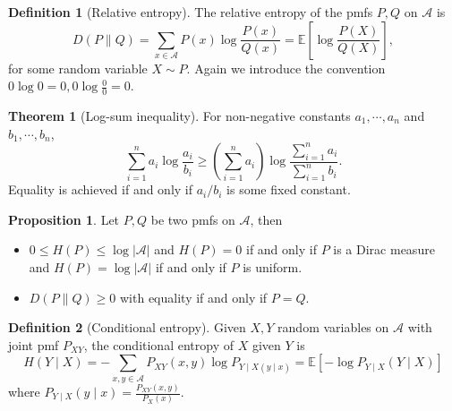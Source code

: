 \documentclass[]{article}
\theoremstyle{definition}
\newtheorem{theorem}{Theorem}
\newtheorem*{definition}{Definition}
\newtheorem*{proposition}{Proposition}
\begin{document}
\begin{definition}[Relative entropy]
  The relative entropy of the pmfs \(P, Q\) on \(\mathscr{A}\) is 
  \[D(P \| Q)= \sum_{x \in \mathscr{A}}P(x) \log\frac{P(x)}{Q(x)} = 
  \mathbb{E}\left[\log\frac{P(X)}{Q(X)}\right],\]
  for some random variable \(X \sim P\). Again we introduce the convention 
  \(0\log 0 = 0, 0 \log \frac{0}{0} = 0\).
\end{definition}

\begin{theorem}[Log-sum inequality]
  For non-negative constants \(a_1, \cdots, a_n\) and \(b_1, \cdots, b_n\),
  \[\sum_{i = 1}^n a_i\log\frac{a_i}{b_i} \ge \left(\sum_{i = 1}^n a_i\right) \log \frac{\sum_{i = 1}^n a_i}{\sum_{i = 1}^n b_i}.\]
  Equality is achieved if and only if \(a_i / b_i\) is some fixed constant.
\end{theorem}

\begin{proposition}
  Let \(P, Q\) be two pmfs on \(\mathscr{A}\), then 
  \begin{itemize}
    \item \(0 \le H(P) \le \log|\mathscr{A}|\) and \(H(P) = 0\) if and only if \(P\) is a Dirac measure
      and \(H(P) = \log|\mathscr{A}|\) if and only if \(P\) is uniform.
    \item \(D(P \| Q) \ge 0\) with equality if and only if \(P = Q\).
  \end{itemize}
\end{proposition}

\begin{definition}[Conditional entropy]
  Given \(X, Y\) random variables on \(\mathscr{A}\) with joint pmf \(P_{XY}\), the conditional entropy 
  of \(X\) given \(Y\) is 
  \[H(Y \mid X) = -\sum_{x,y \in \mathscr{A}} P_{XY}(x, y) \log P_{Y \mid X(y \mid x)}= \mathbb{E}[-\log P_{Y \mid X}(Y \mid X)]\]
  where \(P_{Y \mid X}(y \mid x) = \frac{P_{XY}(x, y)}{P_X(x)}\).
\end{definition}
\end{document}
